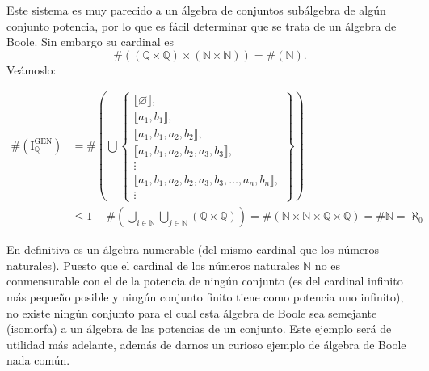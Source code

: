   Este sistema es muy parecido a un álgebra de conjuntos subálgebra de
  algún conjunto po\-tencia, por lo que es fácil determinar que se trata
  de un álgebra de Boole. Sin embargo su cardinal es
  \[\#{\left( {\left( {\mathbb{Q} \times \mathbb{Q}} \right) \times \left( {\mathbb{N} \times \mathbb{N}} \right)} \right) = \#}\left( \mathbb{N} \right) . \]
  Veámoslo:

  \begin{align*}
  \#\left( \mathbf{\mathrm{I}}_{\mathbb{Q}}^{\mathbf{\mathrm{GEN}}} \right) &= \#\left( \bigcup \begin{Bmatrix}
  \llbracket\varnothing \rrbracket, \\
  \llbracket a_1, b_1 \rrbracket, \\
  \llbracket a_1, b_1, a_2, b_2 \rrbracket, \\
  \llbracket a_1, b_1, a_2, b_2, a_3, b_3 \rrbracket, \\
  \vdots \\
  \llbracket a_1, b_1, a_2, b_2, a_3, b_3, \ldots, a_n, b_n \rrbracket, \\
  \vdots
  \end{Bmatrix} \right) \\
  &\leq 1 + \#\left( \bigcup_{i \in \mathbb{N}} \bigcup_{j \in \mathbb{N}} (\mathbb{Q} \times \mathbb{Q}) \right) = \#( \mathbb{N} \times \mathbb{N} \times \mathbb{Q} \times \mathbb{Q} ) = \#\mathbb{N} = \aleph_{0}
  \end{align*}

  En definitiva es un álgebra numerable (del mismo cardinal que los
  números naturales). Puesto que el cardinal de los números naturales
  $\mathbb{N}$ no es conmensurable con el de la potencia de ningún
  conjunto (es del cardinal infinito más pequeño posible y ningún
  conjunto finito tiene como potencia uno infinito), no existe ningún
  conjunto para el cual esta álgebra de Boole sea semejante (isomorfa) a
  un álgebra de las potencias de un conjunto. Este ejemplo será de
  utilidad más adelante, además de darnos un curioso ejemplo de álgebra
  de Boole nada común.

